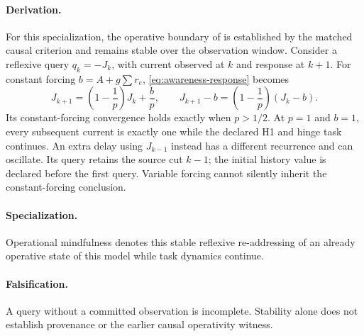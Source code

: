\paragraph{Derivation.}
For this specialization, the operative boundary of 
is established by the matched causal criterion and remains stable over the
observation window. Consider a reflexive query \(q_k=-J_k\), with current
observed at \(k\) and response at \(k+1\). For constant forcing
\(b=A+g\sum r_e\), \eqref{eq:awareness-response} becomes
\begin{equation}
 J_{k+1}=\left(1-\frac1p\right)J_k+\frac bp,\qquad
 J_{k+1}-b=\left(1-\frac1p\right)(J_k-b).
 \label{eq:mindfulness-stability}
\end{equation}
Its constant-forcing convergence holds exactly when \(p>1/2\). At \(p=1\)
and \(b=1\), every subsequent current is exactly one while the declared H1
and hinge task continues. An extra delay using \(J_{k-1}\) instead has a
different recurrence and can oscillate. Its query retains the source cut
\(k-1\); the initial history value is declared before the first query.
Variable forcing cannot silently
inherit the constant-forcing conclusion.

\paragraph{Specialization.}
Operational mindfulness denotes this stable reflexive re-addressing of an
already operative state of this model while task dynamics continue.

\paragraph{Falsification.}
A query without a committed observation is incomplete. Stability alone
does not establish provenance or the earlier causal operativity witness.


